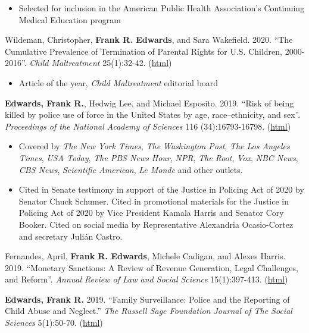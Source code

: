 \documentclass[margin,line]{res}
\begin{document}
\begin{resume}
\begin{itemize}
	\item Selected for inclusion in the American Public Health Association's Continuing Medical Education program
\end{itemize}

Wildeman, Christopher, \textbf{Frank R. Edwards}, and Sara Wakefield. 2020. ``The Cumulative Prevalence of Termination of Parental Rights for U.S. Children, 2000-2016''. \textit{Child Maltreatment} 25(1):32-42. (\href{https://doi.org/10.1177/1077559519848499}{html})

\begin{itemize}
  \item Article of the year, \textit{Child Maltreatment} editorial board
\end{itemize}

\textbf{Edwards, Frank R.}, Hedwig Lee, and Michael Esposito. 2019. ``Risk of being killed by police use of force in the United States by age, race–ethnicity, and sex''. \textit{Proceedings of the National Academy of Sciences} 116 (34):16793-16798. (\href{https://www.pnas.org/content/116/34/16793}{html})

\begin{itemize}
  \item Covered by \textit{The New York Times}, \textit{The Washington Post}, \textit{The Los Angeles Times}, \textit{USA Today}, \textit{The PBS News Hour}, \textit{NPR}, \textit{The Root}, \textit{Vox}, \textit{NBC News}, \textit{CBS News}, \textit{Scientific American}, \textit{Le Monde} and other outlets.
  \item Cited in Senate testimony in support of the Justice in Policing Act of 2020 by Senator Chuck Schumer. Cited in promotional materials for the Justice in Policing Act of 2020 by Vice President Kamala Harris and Senator Cory Booker. Cited on social media by Representative Alexandria Ocasio-Cortez and secretary Julián Castro. 
\end{itemize} 

Fernandes, April, \textbf{Frank R. Edwards}, Michele Cadigan, and Alexes Harris. 2019. ``Monetary Sanctions: A Review of Revenue Generation, Legal Challenges, and Reform''. \textit{Annual Review of Law and Social Science} 15(1):397-413. (\href{https://www.annualreviews.org/doi/abs/10.1146/annurev-lawsocsci-101518-042816}{html})

\textbf{Edwards, Frank R.} 2019. ``Family Surveillance: Police and the Reporting of Child Abuse and Neglect.'' \textit{The Russell Sage Foundation Journal of The Social Sciences} 5(1):50-70. (\href{https://www.rsfjournal.org/content/5/1/50}{html})


\end{resume}
\end{document}
